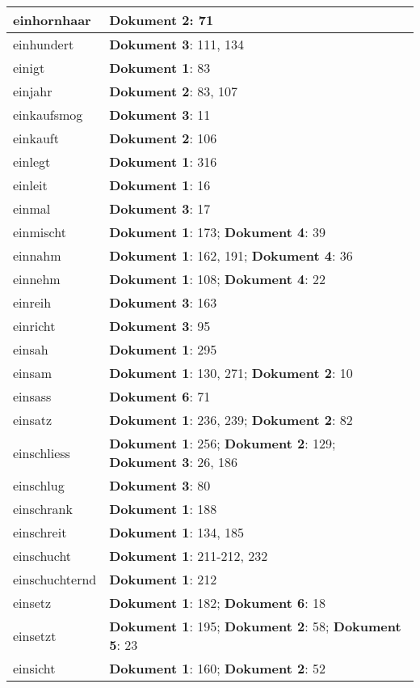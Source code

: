 \documentclass[a5paper]{article}
\begin{document}
\begin{longtable}[l]{|l|p{3in}|}
\hline
einhornhaar & \textbf{Dokument 2}: 71 \\
\hline
einhundert & \textbf{Dokument 3}: 111, 134 \\
\hline
einigt & \textbf{Dokument 1}: 83 \\
\hline
einjahr & \textbf{Dokument 2}: 83, 107 \\
\hline
einkaufsmog & \textbf{Dokument 3}: 11 \\
\hline
einkauft & \textbf{Dokument 2}: 106 \\
\hline
einlegt & \textbf{Dokument 1}: 316 \\
\hline
einleit & \textbf{Dokument 1}: 16 \\
\hline
einmal & \textbf{Dokument 3}: 17 \\
\hline
einmischt & \textbf{Dokument 1}: 173; \textbf{Dokument 4}: 39 \\
\hline
einnahm & \textbf{Dokument 1}: 162, 191; \textbf{Dokument 4}: 36 \\
\hline
einnehm & \textbf{Dokument 1}: 108; \textbf{Dokument 4}: 22 \\
\hline
einreih & \textbf{Dokument 3}: 163 \\
\hline
einricht & \textbf{Dokument 3}: 95 \\
\hline
einsah & \textbf{Dokument 1}: 295 \\
\hline
einsam & \textbf{Dokument 1}: 130, 271; \textbf{Dokument 2}: 10 \\
\hline
einsass & \textbf{Dokument 6}: 71 \\
\hline
einsatz & \textbf{Dokument 1}: 236, 239; \textbf{Dokument 2}: 82 \\
\hline
einschliess & \textbf{Dokument 1}: 256; \textbf{Dokument 2}: 129; \textbf{Dokument 3}: 26, 186 \\
\hline
einschlug & \textbf{Dokument 3}: 80 \\
\hline
einschrank & \textbf{Dokument 1}: 188 \\
\hline
einschreit & \textbf{Dokument 1}: 134, 185 \\
\hline
einschucht & \textbf{Dokument 1}: 211-212, 232 \\
\hline
einschuchternd & \textbf{Dokument 1}: 212 \\
\hline
einsetz & \textbf{Dokument 1}: 182; \textbf{Dokument 6}: 18 \\
\hline
einsetzt & \textbf{Dokument 1}: 195; \textbf{Dokument 2}: 58; \textbf{Dokument 5}: 23 \\
\hline
einsicht & \textbf{Dokument 1}: 160; \textbf{Dokument 2}: 52 \\

\end{longtable}
\end{document}
